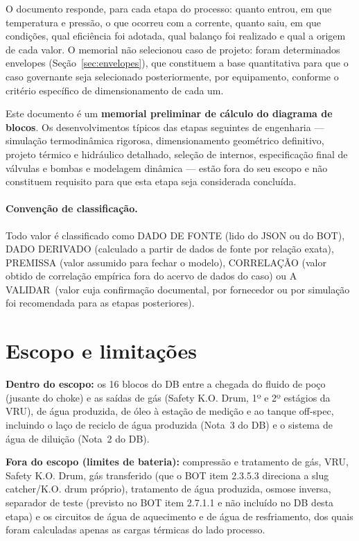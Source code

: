 \documentclass[11pt,a4paper]{article}
\numberwithin{equation}{section}
\numberwithin{table}{section}
\numberwithin{figure}{section}
\newcommand{\tipo}[1]{\textsf{\footnotesize #1}}
\newcommand{\AV}{\textcolor{red!70!black}{\tipo{A VALIDAR}}}
\begin{document}
O documento responde, para cada etapa do processo: quanto entrou, em que temperatura e pressão, o que ocorreu com a corrente, quanto saiu, em que condições, qual eficiência foi adotada, qual balanço foi realizado e qual a origem de cada valor. O memorial não selecionou caso de projeto: foram determinados envelopes (Seção~\ref{sec:envelopes}), que constituem a base quantitativa para que o caso governante seja selecionado posteriormente, por equipamento, conforme o critério específico de dimensionamento de cada um.

Este documento é um \textbf{memorial preliminar de cálculo do diagrama de blocos}. Os desenvolvimentos típicos das etapas seguintes de engenharia --- simulação termodinâmica rigorosa, dimensionamento geométrico definitivo, projeto térmico e hidráulico detalhado, seleção de internos, especificação final de válvulas e bombas e modelagem dinâmica --- estão fora do seu escopo e não constituem requisito para que esta etapa seja considerada concluída.

\paragraph{Convenção de classificação.} Todo valor é classificado como \tipo{DADO DE FONTE} (lido do JSON ou do BOT), \tipo{DADO DERIVADO} (calculado a partir de dados de fonte por relação exata), \tipo{PREMISSA} (valor assumido para fechar o modelo), \tipo{CORRELAÇÃO} (valor obtido de correlação empírica fora do acervo de dados do caso) ou \AV\ (valor cuja confirmação documental, por fornecedor ou por simulação foi recomendada para as etapas posteriores).

\section{Escopo e limitações}
\textbf{Dentro do escopo:} os 16 blocos do DB entre a chegada do fluido de poço (jusante do choke) e as saídas de gás (Safety K.O. Drum, 1º e 2º estágios da VRU), de água produzida, de óleo à estação de medição e ao tanque off-spec, incluindo o laço de reciclo de água produzida (Nota~3 do DB) e o sistema de água de diluição (Nota~2 do DB).

\textbf{Fora do escopo (limites de bateria):} compressão e tratamento de gás, VRU, Safety K.O. Drum, gás transferido (que o BOT item 2.3.5.3 direciona a slug catcher/K.O. drum próprio), tratamento de água produzida, osmose inversa, separador de teste (previsto no BOT item 2.7.1.1 e não incluído no DB desta etapa) e os circuitos de água de aquecimento e de água de resfriamento, dos quais foram calculadas apenas as cargas térmicas do lado processo.
\end{document}
